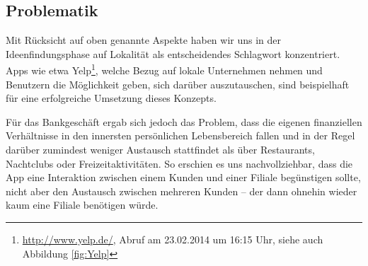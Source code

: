 
\subsection{Problematik}
	Mit Rücksicht auf oben genannte Aspekte haben wir uns in der Ideenfindungsphase auf Lokalität als entscheidendes Schlagwort konzentriert. Apps wie etwa Yelp\footnote{\url{http://www.yelp.de/}, Abruf am 23.02.2014 um 16:15 Uhr, siehe auch Abbildung \ref{fig:Yelp}}, welche Bezug auf lokale Unternehmen nehmen und Benutzern die Möglichkeit geben, sich darüber auszutauschen, sind beispielhaft für eine erfolgreiche Umsetzung dieses Konzepts.
	
	Für das Bankgeschäft ergab sich jedoch das Problem, dass die eigenen finanziellen Verhältnisse in den innersten persönlichen Lebensbereich fallen und in der Regel darüber zumindest weniger Austausch stattfindet als über Restaurants, Nachtclubs oder Freizeitaktivitäten. So erschien es uns nachvollziehbar, dass die App eine Interaktion zwischen einem Kunden und einer Filiale begünstigen sollte, nicht aber den Austausch zwischen mehreren Kunden – der dann ohnehin wieder kaum eine Filiale benötigen würde.

